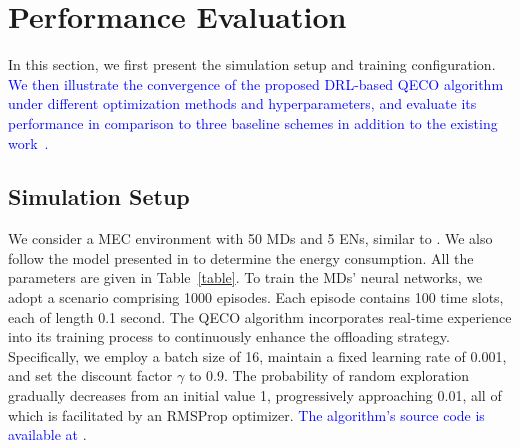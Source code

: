 \documentclass[12pt,draftclsnofoot,onecolumn]{IEEEtran}
\begin{document}
\section{Performance Evaluation}\label{section:VI}
In this section, we first present the simulation setup and training configuration. \textcolor{blue}{We then illustrate the convergence of the proposed DRL-based QECO algorithm under different optimization methods and hyperparameters, and evaluate its performance in comparison to three baseline schemes in addition to the existing work~\cite{qiu2020distributed}.}




\subsection{Simulation Setup}
We consider a MEC environment with 50 MDs and 5 ENs, similar to \cite{9253665}. We also follow the model presented in \cite{zhou2021deep} to determine the energy consumption. All the parameters are given in Table~\ref{table}. To train the MDs' neural networks, we adopt a scenario comprising 1000 episodes. Each episode contains 100 time slots, each of length 0.1 second. The QECO algorithm incorporates real-time experience into its training process to continuously enhance the offloading strategy. Specifically, we employ a batch size of 16, maintain a fixed learning rate of 0.001, and set the discount factor $\gamma$ to 0.9. The probability of random exploration gradually decreases from an initial value 1, progressively approaching 0.01, all of which is facilitated by an RMSProp optimizer. \textcolor{blue}{The algorithm's source code is available at \cite{QECO}}.
\end{document}
